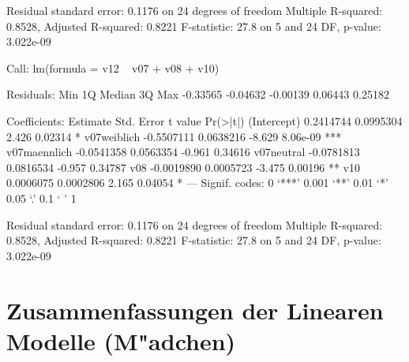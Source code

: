 \begin{Schunk}
\begin{Soutput}
Residual standard error: 0.1176 on 24 degrees of freedom
Multiple R-squared: 0.8528,	Adjusted R-squared: 0.8221 
F-statistic:  27.8 on 5 and 24 DF,  p-value: 3.022e-09 
\end{Soutput}
\begin{Soutput}
Call:
lm(formula = v12 ~ v07 + v08 + v10)

Residuals:
     Min       1Q   Median       3Q      Max 
-0.33565 -0.04632 -0.00139  0.06443  0.25182 

Coefficients:
               Estimate Std. Error t value Pr(>|t|)    
(Intercept)   0.2414744  0.0995304   2.426  0.02314 *  
v07weiblich  -0.5507111  0.0638216  -8.629 8.06e-09 ***
v07maennlich -0.0541358  0.0563354  -0.961  0.34616    
v07neutral   -0.0781813  0.0816534  -0.957  0.34787    
v08          -0.0019890  0.0005723  -3.475  0.00196 ** 
v10           0.0006075  0.0002806   2.165  0.04054 *  
---
Signif. codes:  0 ‘***’ 0.001 ‘**’ 0.01 ‘*’ 0.05 ‘.’ 0.1 ‘ ’ 1 

Residual standard error: 0.1176 on 24 degrees of freedom
Multiple R-squared: 0.8528,	Adjusted R-squared: 0.8221 
F-statistic:  27.8 on 5 and 24 DF,  p-value: 3.022e-09 
\end{Soutput}
\end{Schunk}




\section{Zusammenfassungen der Linearen Modelle (M"adchen)}

